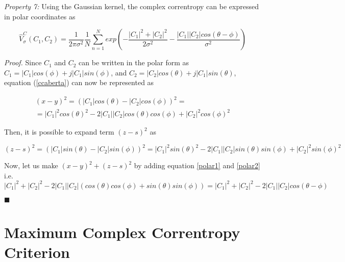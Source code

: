 \documentclass[preprint,12pt]{elsarticle}
\begin{document}


\bigskip
\textit{Property 7:} Using the Gaussian kernel, the complex correntropy can be expressed in polar coordinates as

\begin{equation}
\hat{V}^{C}_{\sigma}(C_{1},C_{2}) = \frac{1}{2\pi\sigma^{2}} \frac{1}{N} \sum\limits_{n=1}^N exp \left ( - \frac{|C_1|^2 + |C_2|^2}{2\sigma^2}  - \frac{|C_1||C_2| cos(\theta-\phi)}{\sigma^2} \right)
\end{equation}

\textit{Proof.}
Since $C_1$ and $C_2$ can be written in the polar form as $C_1 = |C_1|cos(\phi) + j|C_1|sin(\phi)$, and $C_2 = |C_2|cos(\theta) + j|C_1|sin(\theta) $, equation (\ref{ccaberta}) can now be represented as

\begin{equation}\label{polar1}
\begin{split}
(x-y)^2 = (|C_1|cos(\theta) - |C_2|cos(\phi))^2 = \\
= |C_1|^2 cos(\theta)^2 -2|C_1||C_2|cos(\theta)cos(\phi) + |C_2|^2 cos(\phi)^2
\end{split}
\end{equation}

Then, it is possible to expand term $(z-s)^2$ as

\begin{equation}\label{polar2}
(z-s)^2 = (|C_1|sin(\theta) - |C_2|sin(\phi))^2 = |C_1|^2 sin(\theta)^2 -2|C_1||C_2|sin(\theta)sin(\phi) + |C_2|^2 sin(\phi)^2
\end{equation}

Now, let us make $(x-y)^2 + (z-s)^2 $ by adding equation \ref{polar1} and \ref{polar2} i.e.
\begin{equation}
|C_1|^2 + |C_2|^2 - 2|C_1||C_2|(cos(\theta)cos(\phi) + sin(\theta)sin(\phi)) = |C_1|^2 + |C_2|^2 - 2|C_1||C_2|cos(\theta-\phi)
\end{equation}

\begin{flushright}
$\blacksquare$
\end{flushright}


\section{Maximum Complex Correntropy Criterion}
\label{MCCC}
\end{document}
